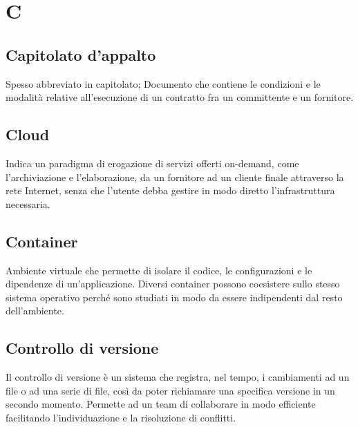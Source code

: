 \section*{C}

\subsection*{Capitolato d'appalto}
Spesso abbreviato in capitolato; Documento che contiene le condizioni e le modalità relative all'esecuzione di un contratto fra un committente e un fornitore.


\subsection*{Cloud}
Indica un paradigma di erogazione di servizi offerti on-demand, come l'archiviazione e l'elaborazione, da un fornitore ad un cliente finale attraverso la rete Internet, senza che l'utente debba gestire in modo diretto l'infrastruttura necessaria.

\subsection*{Container}
Ambiente virtuale che permette di isolare il codice, le configurazioni e le dipendenze di un'applicazione. Diversi container possono coesistere sullo stesso sistema operativo perché sono studiati in modo da essere indipendenti dal resto dell'ambiente.



\subsection*{Controllo di versione}
Il controllo di versione è un sistema che registra, nel tempo, i cambiamenti ad un file o ad una serie di file, così da poter richiamare una specifica versione in un secondo momento.
Permette ad un team di collaborare in modo efficiente facilitando l'individuazione e la risoluzione di conflitti.

